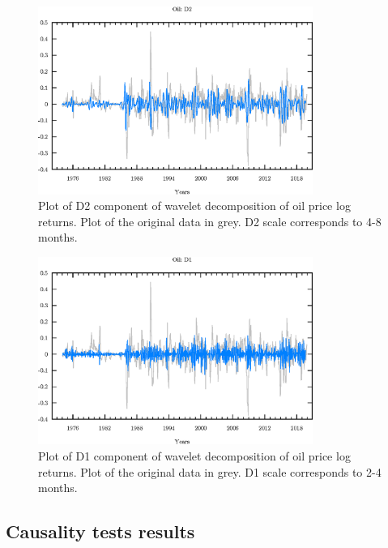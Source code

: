 \begin{figure}
\begin{center}
\includegraphics[width=0.8\textwidth]{./code/plot/oil_wr_D2.eps}
\caption{Plot of D2 component of wavelet decomposition of oil price log returns. 
	Plot of the original data in grey. D2 scale corresponds to 4-8 months.}
\label{fig:oil-wr-d2}
\end{center}
\end{figure}

\begin{figure}
\begin{center}
\includegraphics[width=0.8\textwidth]{./code/plot/oil_wr_D1.eps}
\caption{Plot of D1 component of wavelet decomposition of oil price log returns. 
	Plot of the original data in grey. D1 scale corresponds to 2-4 months.}
\label{fig:oil-wr-d1}
\end{center}
\end{figure}

\newpage
\subsection{Causality tests results}

